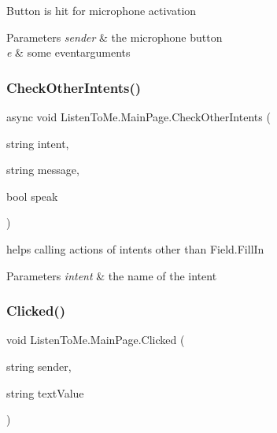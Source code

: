 Button is hit for microphone activation 


\begin{DoxyParams}{Parameters}
{\em sender} & the microphone button\\
\hline
{\em e} & some eventarguments\\
\hline
\end{DoxyParams}
\mbox{\label{class_listen_to_me_1_1_main_page_a83b106bf0b81203d9c02f1bf4dcdd02e}} 
\subsubsection{\texorpdfstring{Check\+Other\+Intents()}{CheckOtherIntents()}}
{\footnotesize\ttfamily async void Listen\+To\+Me.\+Main\+Page.\+Check\+Other\+Intents (\begin{DoxyParamCaption}\item[{string}]{intent,  }\item[{string}]{message,  }\item[{bool}]{speak }\end{DoxyParamCaption})\hspace{0.3cm}{\ttfamily [private]}}



helps calling actions of intents other than Field.\+Fill\+In 


\begin{DoxyParams}{Parameters}
{\em intent} & the name of the intent\\
\hline
\end{DoxyParams}
\mbox{\label{class_listen_to_me_1_1_main_page_a465e7f9723aec19e912a3913841d477e}} 
\subsubsection{\texorpdfstring{Clicked()}{Clicked()}}
{\footnotesize\ttfamily void Listen\+To\+Me.\+Main\+Page.\+Clicked (\begin{DoxyParamCaption}\item[{string}]{sender,  }\item[{string}]{text\+Value }\end{DoxyParamCaption})\hspace{0.3cm}{\ttfamily [private]}}

